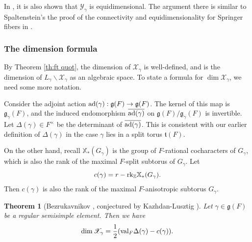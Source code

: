 \documentclass[]{pcmi}
\let\oldsubsubsection\subsubsection
\renewcommand{\subsubsection}[1]{%
\setcounter{subsubsection}{\value{equation}}%
\oldsubsubsection{#1}%
\refstepcounter{equation}%
}
\theoremstyle{plain}
\newtheorem{theorem}[equation]{Theorem}
\theoremstyle{definition}
\def\ZZ{\mathbb{Z}}
\newcommand{\sX}{\ensuremath{\mathscr{X}}\xspace}
\newcommand{\sY}{\ensuremath{\mathscr{Y}}\xspace}
\newcommand{\sX}{\ensuremath{\mathcal{X}}\xspace}
\newcommand{\sY}{\ensuremath{\mathcal{Y}}\xspace}
\newcommand\frg{\mathfrak{g}}
\newcommand\frt{\mathfrak{t}}
\newcommand\rk{\textup{rk}}
\newcommand{\val}{\textup{val}}
\newcommand{\ad}{\textup{ad}}
\newcommand\xcoch{\mathbb{X}_*}
\newcommand{\bs}{\backslash}
\newcommand\ov{\overline}
\begin{document}
In \cite{KL}, it is also shown that $\sY_{\gamma}$ is equidimensional. The argument there is similar to Spaltenstein's the proof of the connectivity and equidimensionality for Springer fibers in \cite{Spa77}.


\subsubsection{The dimension formula}
By Theorem \ref{th:ft quot}, the dimension of $\sX_{\gamma}$ is well-defined, and is the dimension of $L_{\gamma}\bs\sX_{\gamma}$ as an algebraic space. To state a formula for $\dim\sX_{\gamma}$, we need some more notation.

Consider the adjoint action $\ad(\gamma):\frg(F)\to \frg(F)$. The kernel of this map is $\frg_{\gamma}(F)$, and the induced endomorphism $\ov{\ad(\gamma)}$ on $\frg(F)/\frg_{\gamma}(F)$ is invertible. Let $\Delta(\gamma)\in F^{\times}$ be the determinant of $\ov{\ad(\gamma)}$. This is consistent with our earlier definition of $\Delta(\gamma)$ in the case $\gamma$ lies in a split torus $\frt(F)$.

On the other hand, recall $\xcoch(G_{\gamma})$ is the group of $F$-rational cocharacters of $G_{\gamma}$, which is also the rank of the maximal $F$-split subtorus of $G_{\gamma}$. Let
\begin{equation*}
c(\gamma)=r-\rk_{\ZZ}\xcoch(G_{\gamma}).
\end{equation*}
Then $c(\gamma)$ is also the rank of the maximal $F$-anisotropic subtorus $G_{\gamma}$.

\begin{theorem}[Bezrukavnikov {\cite{Bez}}, conjectured by Kazhdan-Lusztig \cite{KL}]\label{th:aff dim} Let $\gamma\in \frg(F)$ be a regular semisimple element. Then we have 
\begin{equation}\label{aff Spr dim}
\dim\sX_{\gamma}=\frac{1}{2}(\val_{F}\Delta(\gamma)-c(\gamma)).
\end{equation}
\end{theorem}
\end{document}
